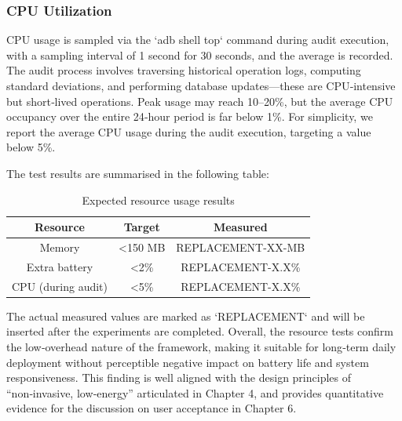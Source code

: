 \subsubsection{CPU Utilization}

CPU usage is sampled via the `adb shell top` command during audit execution, with a sampling interval of 1 second for 30 seconds, and the average is recorded. The audit process involves traversing historical operation logs, computing standard deviations, and performing database updates—these are CPU‑intensive but short‑lived operations. Peak usage may reach 10–20\%, but the average CPU occupancy over the entire 24‑hour period is far below 1\%. For simplicity, we report the average CPU usage during the audit execution, targeting a value below 5\%.

The test results are summarised in the following table:

\begin{table}[H]
\centering
\caption{Expected resource usage results}
\begin{tabular}{c|c|c}
\toprule
\textbf{Resource} & \textbf{Target} & \textbf{Measured} \\
\midrule
Memory & <150 MB & REPLACEMENT-XX-MB \\
Extra battery & <2\% & REPLACEMENT-X.X\% \\
CPU (during audit) & <5\% & REPLACEMENT-X.X\% \\
\bottomrule
\end{tabular}
\end{table}

The actual measured values are marked as `REPLACEMENT` and will be inserted after the experiments are completed. Overall, the resource tests confirm the low‑overhead nature of the framework, making it suitable for long‑term daily deployment without perceptible negative impact on battery life and system responsiveness. This finding is well aligned with the design principles of “non‑invasive, low‑energy” articulated in Chapter 4, and provides quantitative evidence for the discussion on user acceptance in Chapter 6.
